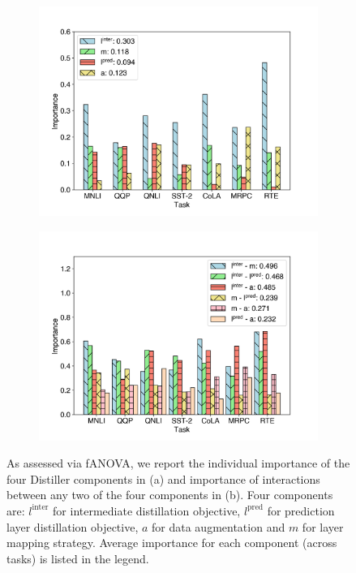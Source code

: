 \documentclass[11pt]{article}
\begin{document}
\begin{figure}[!tb]
    \centering
    \begin{subfigure}[b]{0.45\textwidth}
    \centering
    \includegraphics[width=1.0\textwidth]{pics/fanova_single_wo_stsb.png}
    \caption{}
    \end{subfigure}
    \begin{subfigure}[b]{0.45\textwidth}
    \centering
    \includegraphics[width=1.0\textwidth]{pics/fanova_double_wo_stsb.png}
    \caption{}
    \end{subfigure}
    \vspace{-1em}
    \caption{As assessed via fANOVA, we report the individual importance of the four Distiller components in (a) and importance of interactions between any two of the four components in (b). Four components are: $l^{\text{inter}}$ for intermediate distillation objective, $l^{\text{pred}}$ for prediction layer distillation objective, $a$ for data augmentation and $m$ for layer mapping strategy. Average importance for each component (across tasks) is listed in the legend.}
    \label{fig:fanova}
\end{figure}
\end{document}
